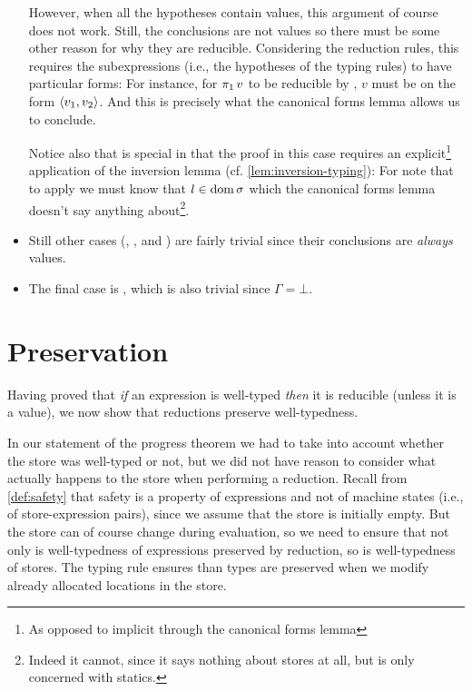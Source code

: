 \begin{itemize}
    However, when all the hypotheses contain values, this argument of course does not work. Still, the conclusions are not values so there must be some other reason for why they are reducible. Considering the reduction rules, this requires the subexpressions (i.e., the hypotheses of the typing rules) to have particular forms: For instance, for $\expProjl{v}$ to be reducible by , $v$ must be on the form $\langle\textcolor{black}{v_1},\textcolor{black}{v_2}\rangle$. And this is precisely what the canonical forms lemma allows us to conclude.

    Notice also that  is special in that the proof in this case requires an explicit\footnote{As opposed to implicit through the canonical forms lemma} application of the inversion lemma (cf. \cref{lem:inversion-typing}): For note that to apply  we must know that $l \in \operatorname{dom}{\sigma}$ which the canonical forms lemma doesn't say anything about\footnote{Indeed it cannot, since it says nothing about stores at all, but is only concerned with statics.}.

    \item Still other cases (, ,  and ) are fairly trivial since their conclusions are \emph{always} values.

    \item The final case is , which is also trivial since $\Gamma = \bot$.
\end{itemize}


\section{Preservation}

Having proved that \emph{if} an expression is well-typed \emph{then} it is reducible (unless it is a value), we now show that reductions preserve well-typedness.

In our statement of the progress theorem we had to take into account whether the store was well-typed or not, but we did not have reason to consider what actually happens to the store when performing a reduction. Recall from \cref{def:safety} that safety is a property of expressions and not of machine states (i.e., of store-expression pairs), since we assume that the store is initially empty. But the store can of course change during evaluation, so we need to ensure that not only is well-typedness of expressions preserved by reduction, so is well-typedness of stores. The typing rule  ensures than types are preserved when we modify already allocated locations in the store.

